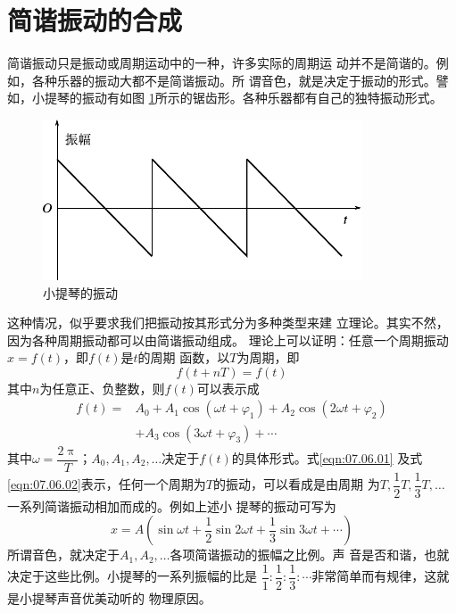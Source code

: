\section{简谐振动的合成}\label{sec:07.06}

简谐振动只是振动或周期运动中的一种，许多实际的周期运
\clearpage
\noindent 动并不是简谐的。例如，各种乐器的振动大都不是简谐振动。所
谓音色，就是决定于振动的形式。譬如，小提琴的振动有如图
\ref{fig:07.10}\;所示的锯齿形。各种乐器都有自己的独特振动形式。

\begin{figure}[h]
  \centering
  \includegraphics{figure/fig07.10}
  \caption{小提琴的振动}
  \label{fig:07.10}
\end{figure}

这种情况，似乎要求我们把振动按其形式分为多种类型来建
立理论。其实不然，因为各种周期振动都可以由简谐振动组成。
理论上可以证明：任意一个周期振动$ x = f \left( t \right) $，即$ f \left( t \right) $是$ t $的周期
函数，以$ T $为周期，即
\begin{equation}\label{eqn:07.06.01}
  f \left( t + n T \right) = f ( t )
\end{equation}
其中$ n $为任意正、负整数，则$ f \left( t \right) $可以表示成
{\setlength{\mathindent}{4em}
\begin{equation}\label{eqn:07.06.02}
  \begin{aligned}
    f \left( t \right) = & A _ { 0 } + A _ { 1 } \cos \left( \omega t + \varphi _ { 1 } \right) + A _ { 2 } \cos \left( 2 \omega t + \varphi _ { 2 } \right) \\
                         & + A _ { 3 } \cos \left( 3 \omega t + \varphi _ { 3 } \right) + \cdots
  \end{aligned}
\end{equation}}%
其中$\omega = \dfrac { 2 \uppi } { T } $；$ A _ { 0 }, A _ { 1 }, A _ { 2 }, \dots $决定于$ f \left( t \right) $的具体形式。式\eqref{eqn:07.06.01}
及式\eqref{eqn:07.06.02}表示，任何一个周期为$ T $的振动，可以看成是由周期
为$ T, \dfrac { 1 } { 2 } T , \dfrac { 1 } { 3 } T  , \dots $一系列简谐振动相加而成的。例如上述小
提琴的振动可写为
\begin{equation*}
  x = A \left( \sin \omega t + \frac { 1 } { 2 } \sin 2 \omega t + \frac { 1 } { 3 } \sin 3 \omega t + \cdots \right)
\end{equation*}
所谓音色，就决定于$ A _ { 1 } , A _ { 2 }, \dots $各项简谐振动的振幅之比例。声
音是否和谐，也就决定于这些比例。小提琴的一系列振幅的比是
$ \dfrac { 1 } { 1 } : \dfrac { 1 } { 2 } : \dfrac { 1 } { 3 }
  : \cdots $非常简单而有规律，这就是小提琴声音优美动听的
物理原因。

